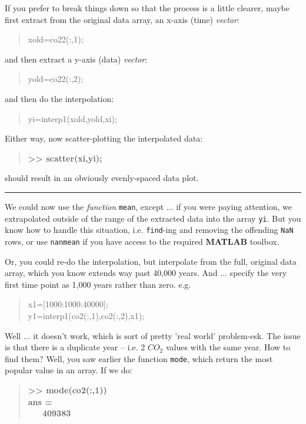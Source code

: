 \documentclass{tufte-book} %
\newenvironment{docspec}{\begin{quotation}\ttfamily\parskip0pt\parindent0pt\ignorespaces}{\end{quotation}}
\newenvironment{docspecbold}{\begin{quotation}\ttfamily\bfseries\parskip0pt\parindent0pt\ignorespaces}{\end{quotation}}
\begin{document}
If you prefer to break things down so that the process is a little clearer, maybe first extract from the original data array, an x-axis (time) \textit{vector}:
\begin{docspec}
xold=co22(:,1);
\end{docspec}
and then extract a y-axis (data) \textit{vector}:
\begin{docspec}
yold=co22(:,2);
\end{docspec}
and then do the interpolation:
\begin{docspec}
yi=interp1(xold,yold,xi);
\end{docspec}

Either way, now scatter-plotting the interpolated data:
\begin{docspecbold}
>> scatter(xi,yi);
\end{docspecbold}

\noindent should result in an obviously evenly-spaced data plot.

\vspace{1mm}
\noindent\rule{4cm}{0.5pt}
\vspace{-2mm}

\newpage 

\newthought{[\textbf{\textcolor{red}{OPTIONAL}}]} We could now use the \textit{function} \texttt{mean}, except ... if you were paying attention,  we extrapolated outside of the range of the extracted data into the array \texttt{yi}. But you know how to handle this situation, i.e. \texttt{find}-ing and removing the offending \texttt{NaN} rows, or use \texttt{nanmean} if you have access to the required \textbf{MATLAB} toolbox.

Or, you could re-do the interpolation, but interpolate from the full, original data array, which you know extends way past 40,000 years. And ... specify the very first time point as 1,000 years rather than zero. e.g.
\begin{docspec}
x1=[1000:1000:40000];\\
y1=interp1(co2(:,1),co2(:,2),x1); 
\end{docspec}

Well ... it doesn't work, which is sort of pretty 'real world' problem-esk. The issue is that there is a duplicate year -- i.e. 2 \(CO_{2}\) values with the same year. How to find them? Well, you saw earlier the function \texttt{mode}, which return the most popular value in an array. If we do:
\begin{docspecbold}
>> mode(co2(:,1))\\
ans =\\
\ \ \ 409383
\end{docspecbold}
\end{document}
